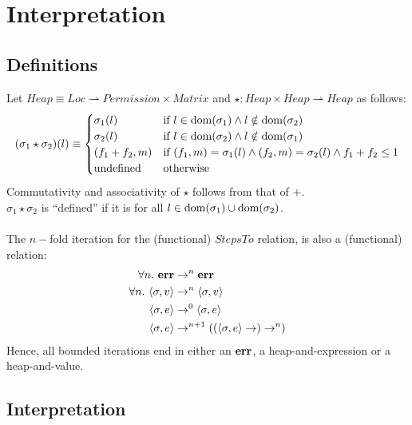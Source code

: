 \section{Interpretation}

\subsection{Definitions}

Let $ Heap \equiv Loc \rightharpoonup Permission \times Matrix$ and
$\star: Heap \times Heap \rightharpoonup Heap$ as follows:
\[
    (\sigma_1 \star \sigma_2)(l) \equiv
    \begin{cases}
        \sigma_1(l) & \textrm{if } l \in \mathrm{dom}(\sigma_1) \wedge l \notin \mathrm{dom}(\sigma_2) \\
        \sigma_2(l) & \textrm{if } l \in \mathrm{dom}(\sigma_2) \wedge l \notin \mathrm{dom}(\sigma_1) \\
        (f_1 + f_2, m) & \textrm{if } (f_1, m) = \sigma_1(l) \wedge (f_2, m) = \sigma_2(l) \wedge f_1 + f_2 \leq 1 \\
        \textrm{undefined} & \textrm{otherwise}
    \end{cases}
\]
Commutativity and associativity of $\star$ follows from that of $+$.\\
$\sigma_1 \star \sigma_2$ is ``defined'' if it is for all $l \in \mathrm{dom}(\sigma_1) \cup \mathrm{dom}(\sigma_2)$.\\
\\
The $n-$fold iteration for the (functional) $StepsTo$ relation, is also a (functional) relation:
\begin{align*}
    \forall n.\ \mathbf{err} &\rightarrow^n \mathbf{err}\\
    \forall n.\ \langle \sigma , v \rangle &\rightarrow^n \langle \sigma , v \rangle\\
    \langle \sigma , e \rangle &\rightarrow^0 \langle \sigma , e \rangle\\
    \langle \sigma , e \rangle &\rightarrow^{n+1} ((\langle \sigma , e \rangle \rightarrow) \rightarrow^n)
\end{align*}
Hence, all bounded iterations end in either an $\mathbf{err}$, a heap-and-expression or a
heap-and-value.

\subsection{Interpretation}

